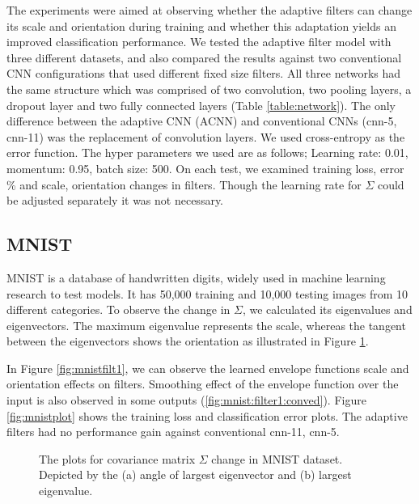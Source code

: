 \documentclass{bmvc2k}
\begin{document}
The experiments were aimed at observing whether the adaptive filters can change its scale and orientation during training and whether this adaptation yields an improved classification performance. We tested the adaptive filter model with three different datasets, and also compared the results against two conventional CNN configurations that used different fixed size filters. All three networks had the same structure which was comprised of two convolution, two pooling layers, a dropout layer and two fully connected layers (Table \ref{table:network}). The only difference between the adaptive CNN (ACNN) and conventional CNNs (cnn-5, cnn-11) was the replacement of convolution layers. We used cross-entropy as the error function.
The hyper parameters we used are as follows; Learning rate: 0.01, momentum: 0.95, batch size: 500. On each test, we examined training loss, error \% and scale, orientation changes in filters. Though the learning rate for $\Sigma$ could be adjusted separately it was not necessary.


\subsection{MNIST}

MNIST \cite{mnist} is a database of handwritten digits, widely used in machine learning research to test models. It has 50,000 training and 10,000 testing images from 10 different categories. To observe the change in $\Sigma$, we calculated its eigenvalues and eigenvectors. The maximum eigenvalue represents the scale, whereas the tangent between the eigenvectors shows the orientation as illustrated in Figure \ref{fig:mnist:convchange}. 

In Figure \ref{fig:mnistfilt1}, we can observe the learned envelope functions scale and orientation effects on filters. Smoothing effect of the envelope function over the input is also observed in some outputs (\ref{fig:mnist:filter1:conved}).
Figure \ref{fig:mnistplot} shows the training loss and classification error plots. The adaptive filters had no performance gain against conventional cnn-11, cnn-5. 


\begin{figure}
	\centering
	\caption{The plots for covariance matrix $\Sigma$ change in MNIST dataset. Depicted by the (a) angle of largest eigenvector and (b) largest eigenvalue.}
	\label{fig:mnist:convchange}
\end{figure}
\end{document}
